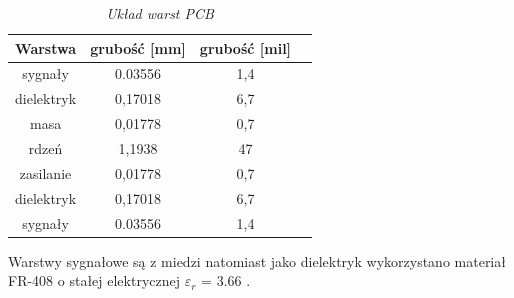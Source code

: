 \documentclass[eng,printmode]{mgr}
\begin{document}
\begin{table}[htb]
\def\arraystretch{1.3}%
\caption{\textit{ Układ warst PCB}}
\label{tab:pcbStack}
\begin{center}
\def\arraystretch{1.3}%
\begin{tabular}{ |c|c|c|c| }
\hline
Warstwa& grubość [mm] & grubość [mil] \\ 
\hline
sygnały & 0.03556 & 1,4 \\ 
\hline
dielektryk & 0,17018 & 6,7\\ 
\hline
masa & 0,01778 & 0,7\\ 
\hline
rdzeń & 1,1938 & 47\\ 
\hline
zasilanie & 0,01778 & 0,7\\ 
\hline
dielektryk & 0,17018 & 6,7\\ 
\hline
sygnały & 0.03556 & 1,4 \\ 
\hline
\end{tabular}
\end{center}
\end{table}

Warstwy sygnałowe są z miedzi natomiast jako dielektryk wykorzystano materiał FR-408 o stałej elektrycznej \textbf{$\varepsilon_r$} = 3.66 \cite{frSpec}.
\end{document}
